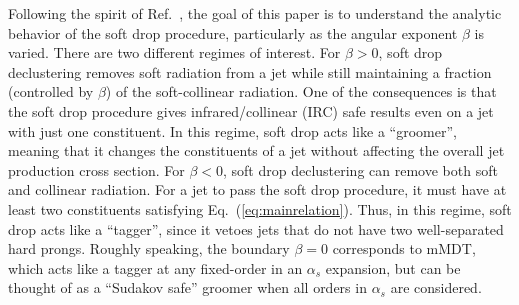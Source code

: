 \documentclass[letterpaper,11pt]{article}
\DeclareRobustCommand{\Eq}[1]{Eq.~(\ref{#1})}
\DeclareRobustCommand{\Ref}[1]{Ref.~\cite{#1}}
\begin{document}
Following the spirit of \Ref{taggersRES}, the goal of this paper is to understand the analytic behavior of the soft drop procedure, particularly as the angular exponent $\beta$ is varied.  There are two different regimes of interest.  For $\beta > 0$, soft drop declustering removes soft radiation from a jet while still maintaining a fraction (controlled by $\beta$) of the soft-collinear radiation.  One of the consequences is that the soft drop procedure gives infrared/collinear (IRC) safe results even on a jet with just one constituent.  In this regime, soft drop acts like a ``groomer'', meaning that it changes the constituents of a jet without affecting the overall  jet production cross section.  For $\beta < 0$, soft drop declustering can remove both soft and collinear radiation.  For a jet to pass the soft drop procedure, it must have at least two constituents satisfying \Eq{eq:mainrelation}.  Thus, in this regime, soft drop acts like a ``tagger'', since it vetoes jets that do not have two well-separated hard prongs.  Roughly speaking, the boundary $\beta = 0$ corresponds to mMDT, which acts like a tagger at any fixed-order in an $\alpha_s$ expansion, but can be thought of as a ``Sudakov safe'' \cite{Larkoski:2013paa} groomer when all orders in $\alpha_s$ are considered.
\end{document}
